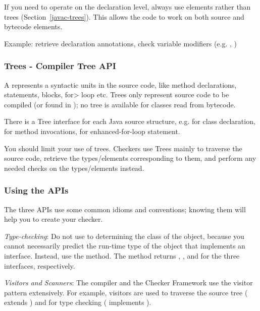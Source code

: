 If you need to operate on the declaration level, always use elements rather
than trees (Section~\ref{javac-trees}).  This allows the code to work on
both source and bytecode elements.

Example: retrieve declaration annotations, check variable
modifiers (e.g. , )


\subsubsection{Trees - Compiler Tree API\label{javac-trees}}

A  represents a syntactic units in the source code,
like method declarations, statements, blocks, \<for> loop etc. Trees only
represent source code to be compiled (or found in );
no tree is available for classes read from bytecode.

There is a Tree interface for each Java source structure, e.g.
 for class declaration, 
for method invocations,  for enhanced-for-loop
statement.

You should limit your use of trees. Checkers use Trees mainly to
traverse the source code, retrieve the types/elements corresponding to
them, and perform any needed checks on the types/elements instead.


\subsubsection{Using the APIs}

The three APIs use some common idioms and conventions; knowing them will
help you to create your checker.

\emph{Type-checking}:
Do not use  to determining the class of the object,
because you cannot necessarily predict the run-time type of the object that
implements an interface.  Instead, use the  method.  The
method returns ,
, and 
for the three interfaces, respectively.

\emph{Visitors and Scanners}:
The compiler and the Checker Framework use the visitor pattern
extensively. For example, visitors are used to traverse the source tree
( extends
) and for type
checking ( implements
).

